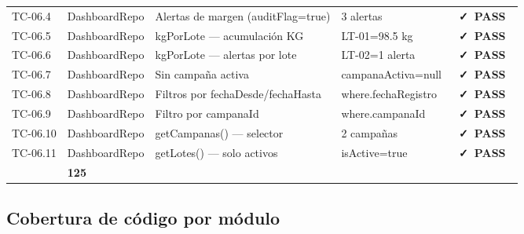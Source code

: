 \documentclass[12pt, a4paper]{article}
\newcommand{\badgePass}{\colorbox{CSuccessBg}{\color{CSuccess}\small\bfseries\ \faCheck\ PASS\ }}
\begin{document}
\begin{longtable}{>{\ttfamily}p{2.1cm} p{2.5cm} p{5.0cm} p{2.5cm} >{\centering\arraybackslash}p{0.9cm}}
  \rowcolor{CBg}
  TC-06.4 & DashboardRepo & Alertas de margen (auditFlag=true) & 3 alertas & \badgePass \\
  TC-06.5 & DashboardRepo & kgPorLote --- acumulación KG & LT-01=98.5 kg & \badgePass \\
  \rowcolor{CBg}
  TC-06.6 & DashboardRepo & kgPorLote --- alertas por lote & LT-02=1 alerta & \badgePass \\
  TC-06.7 & DashboardRepo & Sin campaña activa & campanaActiva=null & \badgePass \\
  \rowcolor{CBg}
  TC-06.8 & DashboardRepo & Filtros por fechaDesde/fechaHasta & where.fechaRegistro & \badgePass \\
  TC-06.9 & DashboardRepo & Filtro por campanaId & where.campanaId & \badgePass \\
  \rowcolor{CBg}
  TC-06.10 & DashboardRepo & getCampanas() --- selector & 2 campañas & \badgePass \\
  TC-06.11 & DashboardRepo & getLotes() --- solo activos & isActive=true & \badgePass \\
  \midrule
  \rowcolor{CRowAlt}
  \multicolumn{4}{r|}{\normalfont\bfseries Total} & \normalfont\bfseries 125 \\
  \bottomrule
\end{longtable}
\normalsize

\subsection{Cobertura de código por módulo}
\end{document}
